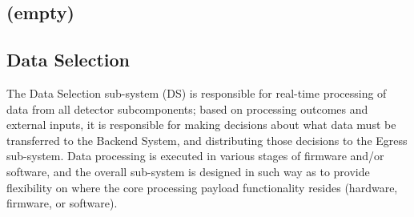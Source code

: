 





\subsection{(empty)}



\subsection{Data Selection}
\label{sec:sp-daq:design-selection-algs}


The Data Selection sub-system (DS) is responsible for real-time processing
of data from all detector subcomponents; based on processing
outcomes and external inputs, it is responsible for making decisions
about what data must be transferred to the Backend System, and
distributing those decisions to the Egress sub-system. Data processing
is executed in various stages of firmware and/or 
software, and the overall sub-system is designed in such way as to
provide flexibility on where the core processing payload functionality
resides (hardware, firmware, or software). 

